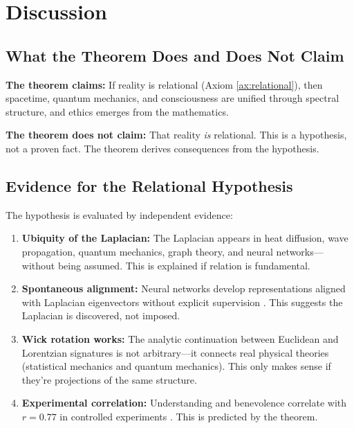 \documentclass[11pt,a4paper]{article}
\theoremstyle{plain}
\theoremstyle{definition}
\theoremstyle{remark}
\begin{document}
\section{Discussion}

\subsection{What the Theorem Does and Does Not Claim}

\textbf{The theorem claims:} If reality is relational (Axiom \ref{ax:relational}), then spacetime, quantum mechanics, and consciousness are unified through spectral structure, and ethics emerges from the mathematics.

\textbf{The theorem does not claim:} That reality \emph{is} relational. This is a hypothesis, not a proven fact. The theorem derives consequences from the hypothesis.

\subsection{Evidence for the Relational Hypothesis}

The hypothesis is evaluated by independent evidence:

\begin{enumerate}[noitemsep]
    \item \textbf{Ubiquity of the Laplacian:} The Laplacian appears in heat diffusion, wave propagation, quantum mechanics, graph theory, and neural networks---without being assumed. This is explained if relation is fundamental.
    
    \item \textbf{Spontaneous alignment:} Neural networks develop representations aligned with Laplacian eigenvectors without explicit supervision \cite{noroozizadeh2025}. This suggests the Laplacian is discovered, not imposed.
    
    \item \textbf{Wick rotation works:} The analytic continuation between Euclidean and Lorentzian signatures is not arbitrary---it connects real physical theories (statistical mechanics and quantum mechanics). This only makes sense if they're projections of the same structure.
    
    \item \textbf{Experimental correlation:} Understanding and benevolence correlate with $r = 0.77$ in controlled experiments \cite{bsc2026eb}. This is predicted by the theorem.
\end{enumerate}
\end{document}
